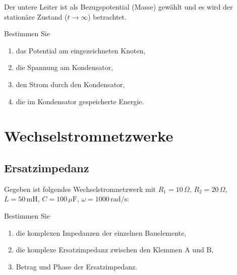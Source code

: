 \documentclass[a4paper,12pt]{article}
\newif\ifshowsolutions
\begin{document}
Der untere Leiter ist als Bezugspotential (Masse) gewählt und es wird der stationäre Zustand ($t \rightarrow \infty$) betrachtet.

Bestimmen Sie

\begin{enumerate}
  \item das Potential am eingezeichneten Knoten,
  \item die Spannung am Kondensator,
  \item den Strom durch den Kondensator,
  \item die im Kondensator gespeicherte Energie.
\end{enumerate}

\ifshowsolutions
Lösung:
\[
\frac{V - U}{R_1} + \frac{V - 0}{R_2} = 0
\]
\[
2(V - 20) + V = 0
\]
\[
V = \frac{40}{3} \approx 13.33\,\text{V}
\]
\[
U_C = V - 0 = 13.33\,\text{V}
\]
\[
i_C = C \frac{du_C}{dt} = 0
\]
\[
W = \frac{1}{2} C U_C^2 \approx 8.9\,\text{mJ}
\]
\fi

\newpage

\section{Wechselstromnetzwerke}

\subsection{Ersatzimpedanz}

Gegeben ist folgendes Wechselstromnetzwerk mit $R_1 = 10\,\Omega$, $R_2 = 20\,\Omega$, $L = 50\,\mathrm{mH}$, $C = 100\,\mu\mathrm{F}$, $\omega = 1000\,\mathrm{rad/s}$:

\begin{center}
\end{center}

Bestimmen Sie

\begin{enumerate}
  \item die komplexen Impedanzen der einzelnen Bauelemente,
  \item die komplexe Ersatzimpedanz zwischen den Klemmen A und B,
  \item Betrag und Phase der Ersatzimpedanz.
\end{enumerate}
\end{document}
